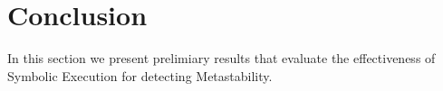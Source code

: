 \section{Conclusion}
\label{sec:conclusion}

In this section we present prelimiary results that evaluate
the effectiveness of Symbolic Execution for detecting Metastability.

